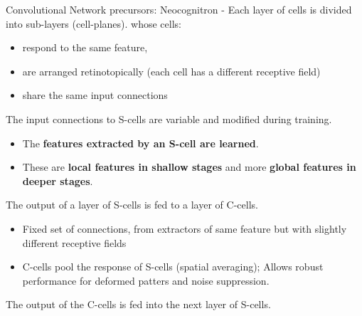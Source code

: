 \begin{frame}[t,allowframebreaks]{Convolutional Network precursors: Neocognitron -}
    Each layer of cells is divided into 
    sub-layers (\glspl{cell-plane}).
    whose cells:
    \begin{itemize}
        \item respond to the same feature,
        \item are arranged retinotopically (each cell has a different receptive field) 
        \item share the same input connections
    \end{itemize}
    The input connections to S-cells are variable and modified during training.
    \begin{itemize}
        \item The {\bf features extracted by an S-cell are learned}.
        \item These are {\bf local features in shallow stages} and 
              more {\bf global features in deeper stages}.
    \end{itemize}
    The output of a layer of S-cells is fed to a layer of C-cells.
    \begin{itemize}
        \item Fixed set of connections, from extractors of same feature
            but with slightly different receptive fields
        \item C-cells pool the response of S-cells (spatial averaging); 
        Allows robust performance for deformed patters and noise suppression.
    \end{itemize}
    The output of the C-cells is fed into the next layer of S-cells.\\

    \framebreak


\end{frame}
